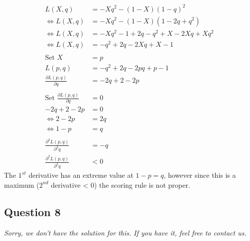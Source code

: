 \documentclass[../main/Notes.tex]{subfiles}
\begin{document}
\begin{align*}
                L(X,q) &= -Xq^2-(1-X)(1-q)^2 \\
\Leftrightarrow L(X,q) &= -Xq^2-(1-X)(1-2q+q^2) \\
\Leftrightarrow L(X,q) &= -Xq^2-1+2q-q^2+X-2Xq+Xq^2 \\
\Leftrightarrow L(X,q) &= -q^2+2q-2Xq+X-1 \\
\\
\text{Set }X&=p \\
L(p,q) &= -q^2+2q-2pq+p-1 \\
\frac{\partial L(p,q)}{\partial q} &= -2q+2-2p \\
\\
\text{Set }\frac{\partial L(p,q)}{\partial q}&=0 \\
-2q+2-2p &= 0\\
\Leftrightarrow 2-2p&=2q \\
\Leftrightarrow 1-p&=q \\
\\
\frac{\partial^2 L(p,q)}{\partial^2 q} &= -q \\
\frac{\partial^2 L(p,q)}{\partial^2 q} &< 0
\end{align*}
The $1^{st}$ derivative has an extreme value at $1-p=q$, however since this is a maximum ($2^{nd}$ derivative < 0) the scoring rule is not proper.



\subsection*{Question 8}
\emph{Sorry, we don't have the solution for this. If you have it, feel free to contact us.}
\end{document}
